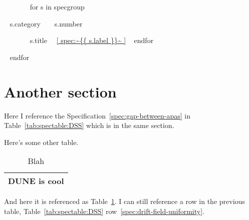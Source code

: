 \documentclass{article}
\begin{document}
\begin{description}
  ~{ for s in specgroup }~
  \item[ ~{{ s.category }}~ ~{{ s.number }}~ ] ~{{ s.title }}~~\ref{ spec:~{{ s.label }}~ }
  ~{ endfor }~
\end{description}
~{ endfor }~


\section{Another section}


Here I reference the Specification~\ref{spec:gap-between-apas} in Table~\ref{tab:spectable:DSS} which is in the same section.


Here's some other table.

\begin{table}[htp]
  \caption{Blah}
  \centering
  \begin{tabular}{|c|}
    \hline
    \label{row:cool} DUNE is cool \\
    \hline
  \end{tabular}
  \label{tab:cool}
\end{table}

And here it is referenced as Table~\ref{tab:cool}.  
I can still reference a row in the previous table,
Table~\ref{tab:spectable:DSS}
row~\ref{spec:drift-field-uniformity}.
\end{document}

